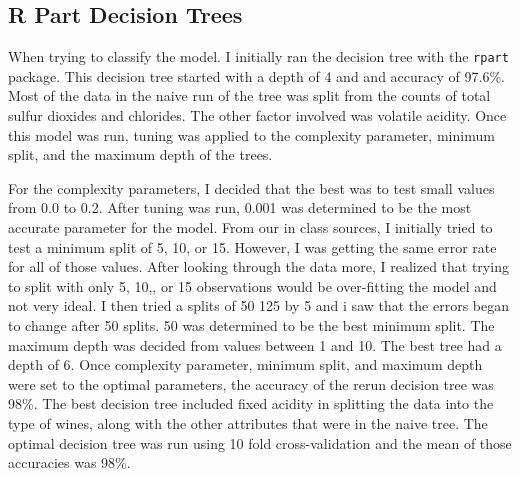 \documentclass[letterpaper]{article}\usepackage[]{graphicx}\usepackage[]{color}
\begin{document}
\subsection*{R Part Decision Trees}
When trying to classify the model. I initially ran the decision tree with the \texttt{rpart} package. This decision tree started with a depth of 4 and and accuracy of 97.6\%. Most of the data in the naive run of the tree was split from the counts of total sulfur dioxides and chlorides. The other factor involved was volatile acidity. Once this model was run, tuning was applied to the complexity parameter, minimum split, and the maximum depth of the trees. 

For the complexity parameters, I decided that the best was to test small values from 0.0 to 0.2. After tuning was run, 0.001 was determined to be the most accurate parameter for the model. From our in class sources, I initially tried to test a minimum split of 5, 10, or 15. However, I was getting the same error rate for all of those values. After looking through the data more, I realized that trying to split with only 5, 10,, or 15 observations would be over-fitting the model and not very ideal. I then tried a splits of 50 125 by 5 and i saw that the errors began to change after 50 splits. 50 was determined to be the best minimum split. The maximum depth was decided from values between 1 and 10. The best tree had a depth of 6. Once complexity parameter, minimum split, and maximum depth were set to the optimal parameters, the accuracy of the rerun decision tree was 98\%. The best decision tree included fixed acidity in splitting the data into the type of wines, along with the other attributes that were in the naive tree. The optimal decision tree was run using 10 fold cross-validation and the mean of those accuracies was 98\%. 
\end{document}
